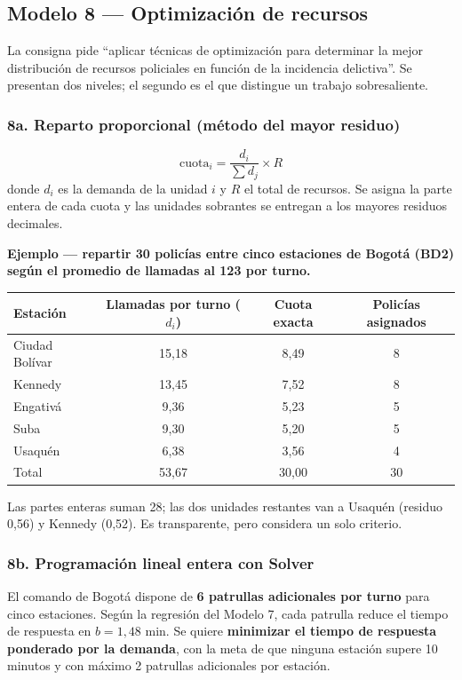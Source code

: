 \subsection{Modelo 8 --- Optimización de recursos}

La consigna pide ``aplicar técnicas de optimización para determinar la mejor
distribución de recursos policiales en función de la incidencia delictiva''. Se
presentan dos niveles; el segundo es el que distingue un trabajo sobresaliente.

\subsubsection*{8a. Reparto proporcional (método del mayor residuo)}

\[
\text{cuota}_i=\frac{d_i}{\sum d_j}\times R
\]
donde $d_i$ es la demanda de la unidad $i$ y $R$ el total de recursos. Se asigna la parte
entera de cada cuota y las unidades sobrantes se entregan a los mayores residuos decimales.

\textbf{Ejemplo --- repartir 30 policías entre cinco estaciones de Bogotá (BD2) según el
promedio de llamadas al 123 por turno.}

\begin{center}
\small
\begin{tabular}{@{}lccc@{}}
\toprule
Estación & Llamadas por turno ($d_i$) & Cuota exacta & Policías asignados\\
\midrule
Ciudad Bolívar & 15,18 & 8,49 & 8\\
Kennedy & 13,45 & 7,52 & 8\\
Engativá & 9,36 & 5,23 & 5\\
Suba & 9,30 & 5,20 & 5\\
Usaquén & 6,38 & 3,56 & 4\\
\midrule
Total & 53,67 & 30,00 & 30\\
\bottomrule
\end{tabular}
\end{center}
Las partes enteras suman 28; las dos unidades restantes van a Usaquén (residuo 0,56) y
Kennedy (0,52). Es transparente, pero considera un solo criterio.

\subsubsection*{8b. Programación lineal entera con Solver}

\begin{cajaInfo}
El comando de Bogotá dispone de \textbf{6 patrullas adicionales por turno} para cinco
estaciones. Según la regresión del Modelo 7, cada patrulla reduce el tiempo de respuesta
en $b=1{,}48$ min. Se quiere \textbf{minimizar el tiempo de respuesta ponderado por la
demanda}, con la meta de que ninguna estación supere 10 minutos y con máximo 2 patrullas
adicionales por estación.
\end{cajaInfo}

